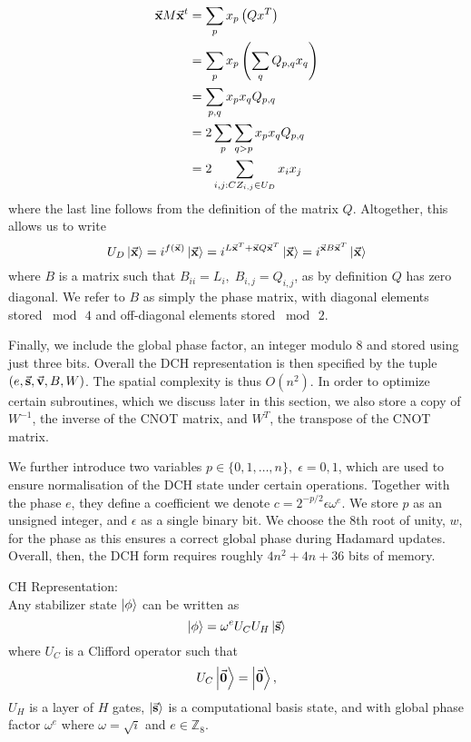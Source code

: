 \begin{align}
\va{x}M\va{x}^{t} &= \sum_{p} x_{p} \left(Qx^{T}\right) \nonumber \\
&= \sum_{p}x_{p}\left(\sum_{q}Q_{p,q} x_{q}\right) \nonumber \\
&= \sum_{p,q} x_{p}x_{q} Q_{p,q}\nonumber \\
&= 2\sum_{p}\sum_{q>p} x_{p}x_{q} Q_{p,q} \nonumber \\
&= 2\sum_{i,j : CZ_{i,j}\in U_{D}} x_{i}x_{j} \nonumber
\end{align}
where the last line follows from the definition of the matrix $Q$. Altogether, this allows us to write~\cite{Bravyi2016}
\begin{equation}
U_{D}\ket{\va{x}} = i^{f(\va{x})}\ket{\va{x}} = i^{L\va{x}^{T} + \va{x}Q\va{x}^{T}}\ket{\va{x}} = i^{\va{x}B\va{x}^{T}}\ket{\va{x}}
\label{eq:phase_encoding}
\end{equation}
where $B$ is a matrix such that $B_{ii}=L_{i},\;B_{i,j}=Q_{i,j}$, as by definition $Q$ has zero diagonal. We refer to $B$ as simply the phase matrix, with diagonal elements stored $\bmod\,4$ and off-diagonal elements stored $\bmod\,2$.\par
Finally, we include the global phase factor, an integer modulo $8$ and stored using just three bits. Overall the DCH representation is then specified by the tuple $\left(e, \va{s}, \va{v}, B, W\right)$. The spatial complexity is thus $O(n^{2})$. In order to optimize certain subroutines, which we discuss later in this section, we also store a copy of $W^{-1}$, the inverse of the CNOT matrix, and $W^{T}$, the transpose of the CNOT matrix.\par
We further introduce two variables $p\in\{0,1,\dots,n\},\;\epsilon=0,1$, which are used to ensure normalisation of the DCH state under certain operations. Together with the phase $e$, they define a coefficient we denote $c=2^{-p/2}\epsilon \omega^{e}$. We store $p$ as an unsigned integer, and $\epsilon$ as a single binary bit. We choose the $8$th root of unity, $w$, for the phase as this ensures a correct global phase during Hadamard updates. Overall, then, the DCH form requires roughly $4n^{2}+4n+36$ bits of memory.
\clearpage
\begin{defn}
CH Representation:\\
Any stabilizer state $\ket{\phi}$ can be written as
\begin{equation}
\ket{\phi} = \omega^{e} U_{C}U_{H}\ket{\va{s}}
\label{eq:ch}
\end{equation}
where $U_{C}$ is a Clifford operator such that
\begin{equation}
U_{C}\ket{\va{0}} = \ket{\va{0}},
\end{equation}
$U_{H}$ is a layer of $H$ gates, $\ket{\va{s}}$ is a computational basis state, and with global phase factor $\omega^{e}$ where $\omega=\sqrt{i}$ and $e\in\mathbb{Z}_{8}$.\label{def:ch}
\end{defn}
